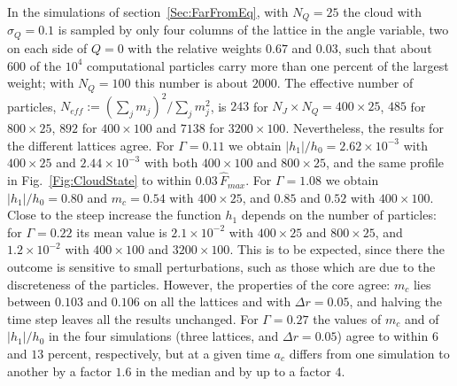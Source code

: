 In the simulations of section~\ref{Sec:FarFromEq}, with $N_Q = 25$ the cloud with $\sigma_Q = 0.1$ is sampled by only four columns of the lattice in the angle variable, two on each side of $Q = 0$ with the relative weights $0.67$ and $0.03$, such that about $600$ of the $10^4$ computational particles carry more than one percent of the largest weight; with $N_Q = 100$ this number is about $2000$. The effective number of particles, $N_{eff} := (\sum_j m_j)^2/\sum_j m_j^2$, is $243$ for $N_J\times N_Q = 400\times 25$, $485$ for $800\times 25$, $892$ for $400\times 100$ and $7138$ for $3200\times 100$. Nevertheless, the results for the different lattices agree. For $\Gamma = 0.11$ we obtain $|h_1|/h_0 = 2.62\times 10^{-3}$ with $400\times 25$ and $2.44\times 10^{-3}$ with both $400\times 100$ and $800\times 25$, and the same profile in Fig.~\ref{Fig:CloudState} to within $0.03\,\hat{F}_{max}$. For $\Gamma = 1.08$ we obtain $|h_1|/h_0 = 0.80$ and $m_c = 0.54$ with $400\times 25$, and $0.85$ and $0.52$ with $400\times 100$. Close to the steep increase the function $h_1$ depends on the number of particles: for $\Gamma = 0.22$ its mean value is $2.1\times 10^{-2}$ with $400\times 25$ and $800\times 25$, and $1.2\times 10^{-2}$ with $400\times 100$ and $3200\times 100$. This is to be expected, since there the outcome is sensitive to small perturbations, such as those which are due to the discreteness of the particles. However, the properties of the core agree: $m_c$ lies between $0.103$ and $0.106$ on all the lattices and with $\Delta r = 0.05$, and halving the time step leaves all the results unchanged. For $\Gamma = 0.27$ the values of $m_c$ and of $|h_1|/h_0$ in the four simulations (three lattices, and $\Delta r = 0.05$) agree to within $6$ and $13$ percent, respectively, but at a given time $a_c$ differs from one simulation to another by a factor $1.6$ in the median and by up to a factor $4$.
